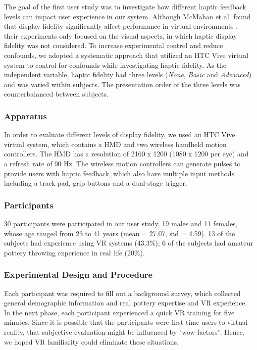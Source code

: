 \documentclass{svjour3}                     %
\begin{document}
The goal of the first user study was to investigate how different haptic feedback levels can impact user experience in our system. 
%
Although McMahan et al. found that display fidelity significantly affect performance in virtual environments \cite{mcmahan2012evaluating}, their experiments only focused on the visual aspects, in which haptic display fidelity was not considered.
%
To increase experimental control and reduce confounds, we adopted a systematic approach that utilized an HTC Vive virtual system to control for confounds while investigating haptic fidelity.
%
As the independent variable, haptic fidelity had three levels (\textit{None}, \textit{Basic} and \textit{Advanced}) and was varied within subjects.
%
The presentation order of the three levels was counterbalanced between subjects.


\subsubsection{Apparatus}
In order to evaluate different levels of display fidelity, we used an HTC Vive virtual system, which contains a HMD and two wireless handheld motion controllers.
The HMD has a resolution of 2160 x 1200 (1080 x 1200 per eye) and a refresh rate of 90 Hz.
The wireless motion controllers can generate pulses to provide users with haptic feedback, which also have multiple input methods including a track pad, grip buttons and a dual-stage trigger.

\subsubsection{Participants}
30 participants were participated in our user study, 19 males and 11 females, whose age ranged from 23 to 41 years (mean = 27.07, std = 4.59). 13 of the subjects had experience using VR systems (43.3\%); 6 of the subjects had amateur pottery throwing experience in real life (20\%).

\subsubsection{Experimental Design and Procedure}

Each participant was required to fill out a background survey, which collected general demographic information and real pottery expertise and VR experience.
In the next phase, each participant experienced a quick VR training for five minutes.
Since it is possible that the participants were first time users to virtual reality, that subjective evaluation might be influenced by "wow-factors".
Hence, we hoped VR familiarity could eliminate these situations.
\end{document}
